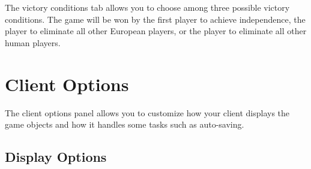 \documentclass[12pt]{book}
\begin{document}
The victory conditions tab allows you to choose among three possible
victory conditions. The game will be won by the first player to
achieve independence, the player to eliminate all other European
players, or the player to eliminate all other human players.


\hypertarget{client options}{\section{Client Options}}

The client options panel allows you to customize how your client
displays the game objects and how it handles some tasks such as
auto-saving.

\hypertarget{display options}{\subsection{Display Options}}
\end{document}
